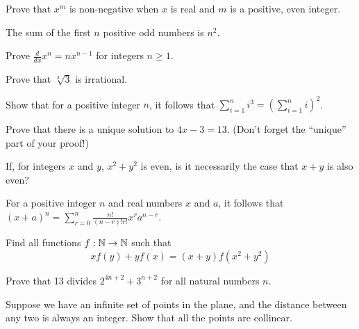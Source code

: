 \begin{exercise}
    Prove that $x^m$ is non-negative when $x$ is real and $m$ is a positive, even integer.
\end{exercise}
\vspace{-5mm}
\begin{exercise}
    The sum of the first $n$ positive odd numbers is $n^2$.
\end{exercise}
\vspace{-5mm}
\begin{exercise}[Calculus]
    Prove $\frac{d}{dx} x^n = nx^{n-1}$ for integers $n\geq 1$.
\end{exercise}
\vspace{-5mm}
\begin{exercise}
    Prove that $\sqrt[3]{3}$ is irrational.
\end{exercise}
\vspace{-5mm}
\begin{exercise}
    Show that for a positive integer $n$, it follows that $\sum_{i=1}^n i^3 = \left(\sum_{i=1}^n i\right)^2$.
\end{exercise}
\vspace{-5mm}
\begin{exercise}
    Prove that there is a unique solution to $4x-3=13$. (Don't forget the ``unique'' part of your proof!)
\end{exercise}
\vspace{-5mm}
\begin{exercise}
    If, for integers $x$ and $y$, $x^2+y^2$ is even, is it necessarily the case that $x+y$ is also even? 
\end{exercise}
\vspace{-5mm}
\begin{exercise}
    For a positive integer $n$ and real numbers $x$ and $a$, it follows that $(x+a)^n=\sum_{r=0}^n \frac{n!}{(n-r)!r!} x^r a^{n-r}$.
\end{exercise}
\vspace{-5mm}
\begin{exercise}
    Find all functions $f : \mathbb{N}\to\mathbb{N}$ such that $$xf(y)+yf(x)=(x+y)f(x^2+y^2)$$
\end{exercise}
\vspace{-5mm}
\begin{exercise}
    Prove that 13 divides $2^{4n+2}+3^{n+2}$ for all natural numbers $n$.
\end{exercise}
\vspace{-5mm}
\begin{exercise}
    Suppose we have an infinite set of points in the plane, and the distance between any two is always an integer. Show that all the points are collinear. 
\end{exercise}

